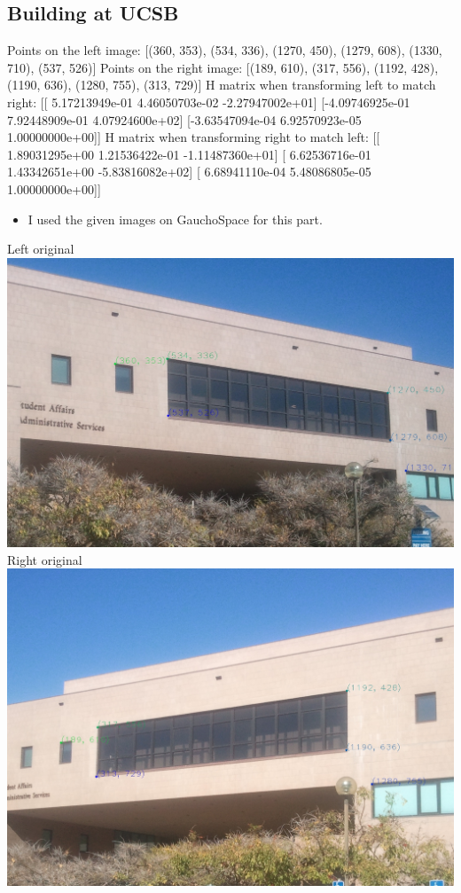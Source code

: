 \documentclass{article}
\begin{document}
\subsection {Building at UCSB}
Points on the left image:
[(360, 353), (534, 336), (1270, 450), (1279, 608), (1330, 710), (537, 526)]
Points on the right image:
[(189, 610), (317, 556), (1192, 428), (1190, 636), (1280, 755), (313, 729)]
H matrix when transforming left to match right:
[[ 5.17213949e-01  4.46050703e-02 -2.27947002e+01]
 [-4.09746925e-01  7.92448909e-01  4.07924600e+02]
 [-3.63547094e-04  6.92570923e-05  1.00000000e+00]]
H matrix when transforming right to match left:
[[ 1.89031295e+00  1.21536422e-01 -1.11487360e+01]
 [ 6.62536716e-01  1.43342651e+00 -5.83816082e+02]
 [ 6.68941110e-04  5.48086805e-05  1.00000000e+00]]
\begin{itemize}
\item I used the given images on GauchoSpace for this part.
\end{itemize}
Left original
\includegraphics[width=\linewidth]{./results/building/left.jpg}
Right original
\includegraphics[width=\linewidth]{./results/building/right.jpg}
\end{document}
